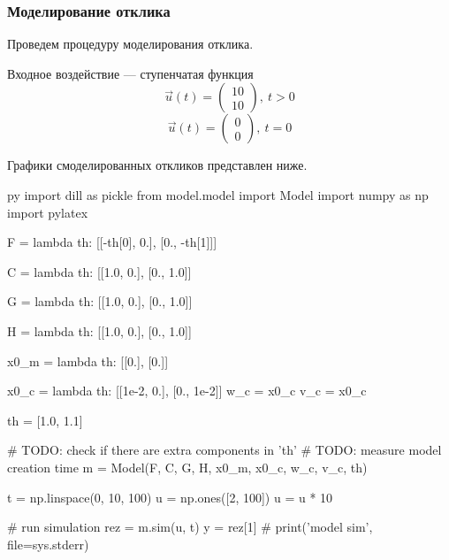 \documentclass[a4paper,14pt]{extarticle}
\begin{document}
\newpage
\subsubsection{Моделирование отклика}

Проведем процедуру моделирования отклика. 

Входное воздействие --- ступенчатая функция
\[
	\vec{u}(t) = \begin{pmatrix} 10 \\ 10 \end{pmatrix},\ t > 0
\]
\[
	\vec{u}(t) = \begin{pmatrix} 0 \\ 0 \end{pmatrix},\ t = 0
\]

Графики смоделированных откликов представлен ниже.

\begin{pythontexcustomcode}{py}
import dill as pickle
from model.model import Model
import numpy as np
import pylatex
\end{pythontexcustomcode}

\renewcommand{\baselinestretch}{1}
\begin{pycode}[model]
F = lambda th: [[-th[0], 0.],
                [0., -th[1]]]

C = lambda th: [[1.0, 0.],
                [0., 1.0]]

G = lambda th: [[1.0, 0.],
                [0., 1.0]]

H = lambda th: [[1.0, 0.],
                [0., 1.0]]

x0_m = lambda th: [[0.],
                   [0.]]

x0_c = lambda th: [[1e-2, 0.],
                   [0., 1e-2]]
w_c = x0_c
v_c = x0_c

th = [1.0, 1.1]

# TODO: check if there are extra components in 'th'
# TODO: measure model creation time
m = Model(F, C, G, H, x0_m, x0_c, w_c, v_c, th)
\end{pycode}
\renewcommand{\baselinestretch}{1.5}

\begin{pycode}[model]
t = np.linspace(0, 10, 100)
u = np.ones([2, 100])
u = u * 10

# run simulation
rez = m.sim(u, t)
y = rez[1]
# print('model sim', file=sys.stderr)
\end{pycode}
\end{document}
